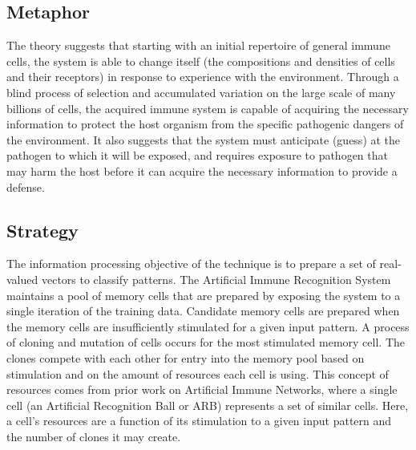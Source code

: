 \subsection{Metaphor}
The theory suggests that starting with an initial repertoire of general immune cells, the system is able to change itself (the compositions and densities of cells and their receptors) in response to experience with the environment. Through a blind process of selection and accumulated variation on the large scale of many billions of cells, the acquired immune system is capable of acquiring the necessary information to protect the host organism from the specific pathogenic dangers of the environment. It also suggests that the system must anticipate (guess) at the pathogen to which it will be exposed, and requires exposure to pathogen that may harm the host before it can acquire the necessary information to provide a defense.

\subsection{Strategy}
The information processing objective of the technique is to prepare a set of real-valued vectors to classify patterns. 
The Artificial Immune Recognition System maintains a pool of memory cells that are prepared by exposing the system to a single iteration of the training data. Candidate memory cells are prepared when the memory cells are insufficiently stimulated for a given input pattern. A process of cloning and mutation of cells occurs for the most stimulated memory cell. The clones compete with each other for entry into the memory pool based on stimulation and on the amount of resources each cell is using. This concept of resources comes from prior work on Artificial Immune Networks, where a single cell (an Artificial Recognition Ball or ARB) represents a set of similar cells. Here, a cell's resources are a function of its stimulation to a given input pattern and the number of clones it may create.

